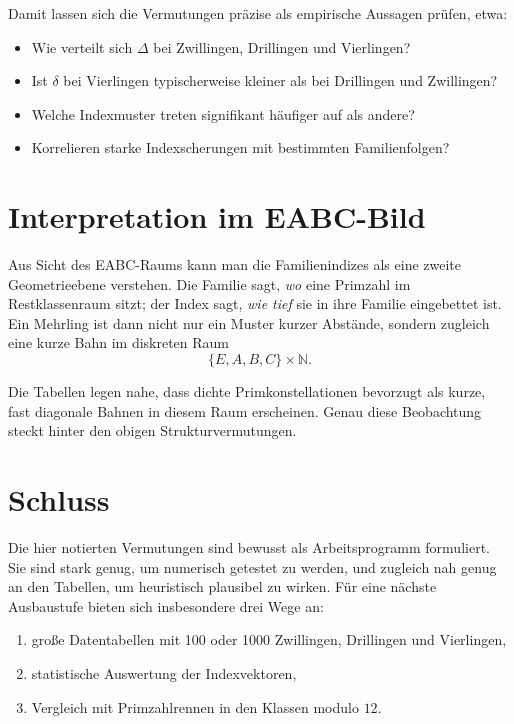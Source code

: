 \documentclass[11pt,a4paper]{article}
\theoremstyle{plain}
\theoremstyle{definition}
\theoremstyle{remark}
\begin{document}
Damit lassen sich die Vermutungen präzise als empirische Aussagen prüfen, etwa:
\begin{itemize}
\item Wie verteilt sich $\Delta$ bei Zwillingen, Drillingen und Vierlingen?
\item Ist $\delta$ bei Vierlingen typischerweise kleiner als bei Drillingen und Zwillingen?
\item Welche Indexmuster treten signifikant häufiger auf als andere?
\item Korrelieren starke Indexscherungen mit bestimmten Familienfolgen?
\end{itemize}

\section{Interpretation im EABC-Bild}

Aus Sicht des EABC-Raums kann man die Familienindizes als eine zweite Geometrieebene verstehen. Die Familie sagt, \emph{wo} eine Primzahl im Restklassenraum sitzt; der Index sagt, \emph{wie tief} sie in ihre Familie eingebettet ist. Ein Mehrling ist dann nicht nur ein Muster kurzer Abstände, sondern zugleich eine kurze Bahn im diskreten Raum
\[
\{E,A,B,C\}\times \mathbb{N}.
\]

Die Tabellen legen nahe, dass dichte Primkonstellationen bevorzugt als kurze, fast diagonale Bahnen in diesem Raum erscheinen. Genau diese Beobachtung steckt hinter den obigen Strukturvermutungen.

\section{Schluss}

Die hier notierten Vermutungen sind bewusst als Arbeitsprogramm formuliert. Sie sind stark genug, um numerisch getestet zu werden, und zugleich nah genug an den Tabellen, um heuristisch plausibel zu wirken. Für eine nächste Ausbaustufe bieten sich insbesondere drei Wege an:
\begin{enumerate}[label=\arabic*.]
\item große Datentabellen mit 100 oder 1000 Zwillingen, Drillingen und Vierlingen,
\item statistische Auswertung der Indexvektoren,
\item Vergleich mit Primzahlrennen in den Klassen modulo $12$.
\end{enumerate}
\end{document}
